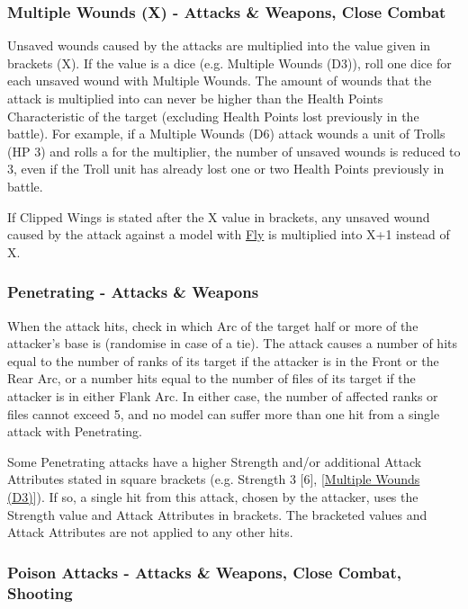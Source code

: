\subsubsection{Multiple Wounds (X) - Attacks \&{} Weapons, Close Combat}
\label{multiple_wounds}

Unsaved wounds caused by the attacks are multiplied into the value given in brackets (X). If the value is a dice (e.g. Multiple Wounds (D3)), roll one dice for each unsaved wound with Multiple Wounds. The amount of wounds that the attack is multiplied into can never be higher than the Health Points Characteristic of the target (excluding Health Points lost previously in the battle). For example, if a Multiple Wounds (D6) attack wounds a unit of Trolls (HP 3) and rolls a  for the multiplier, the number of unsaved wounds is reduced to 3, even if the Troll unit has already lost one or two Health Points previously in battle.

If Clipped Wings is stated after the X value in brackets, any unsaved wound caused by the attack against a model with \hyperref[fly]{Fly} is multiplied into X+1 instead of X.

\subsubsection{Penetrating - Attacks \&{} Weapons}
\label{penetrating}

When the attack hits, check in which Arc of the target half or more of the attacker's base is (randomise in case of a tie). The attack causes a number of hits equal to the number of ranks of its target if the attacker is in the Front or the Rear Arc, or a number hits equal to the number of files of its target if the attacker is in either Flank Arc. In either case, the number of affected ranks or files cannot exceed 5, and no model can suffer more than one hit from a single attack with Penetrating.

Some Penetrating attacks have a higher Strength and/or additional Attack Attributes stated in square brackets (e.g. Strength 3 [6], [\hyperref[multiple_wounds]{Multiple Wounds (D3)}]). If so, a single hit from this attack, chosen by the attacker, uses the Strength value and Attack Attributes in brackets. The bracketed values and Attack Attributes are not applied to any other hits.

\subsubsection{Poison Attacks - Attacks \&{} Weapons, Close Combat, Shooting}
\label{poison_attacks}

